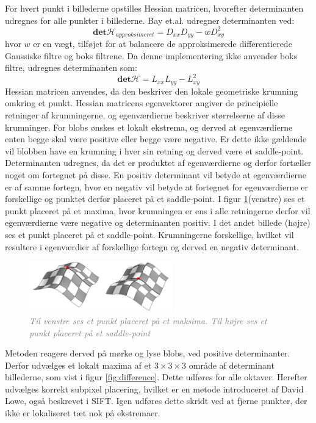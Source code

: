 For hvert punkt i billederne opstilles Hessian matricen, hvorefter determinanten udregnes for alle punkter i billederne. Bay et.al. udregner determinanten ved:
\begin{equation}
\textbf{det}\mathcal{H}_{approksimeret} = D_{xx}D_{yy}-wD_{xy}^2
\label{deerminantofhessian}
\end{equation}
hvor $w$ er en vægt, tilføjet for at balancere de approksimerede differentierede Gaussiske filtre og boks filtrene. Da denne implementering ikke anvender boks filtre, udregnes determinanten som:
\begin{equation}
\textbf{det}\mathcal{H} = L_{xx}L_{yy}-L_{xy}^2
\label{deerminantofhessian}
\end{equation}
Hessian matricen anvendes, da den beskriver den lokale geometriske krumning omkring et punkt. Hessian matricens egenvektorer angiver de principielle retninger af krumningerne, og egenværdierne beskriver størrelserne af disse krumninger. For blobs ønskes et lokalt ekstrema, og derved at egenværdierne enten begge skal være positive eller begge være negative. Er dette ikke gældende vil blobben have en krumning i hver sin retning og derved være et saddle-point. Determinanten udregnes, da det er produktet af egenværdierne og derfor fortæller noget om fortegnet på disse. En positiv determinant vil betyde at egenværdierne er af samme fortegn, hvor en negativ vil betyde at fortegnet for egenværdierne er forskellige og punktet derfor placeret på et saddle-point. I figur \ref{fig:konkav}(venstre) ses et punkt placeret på et maxima, hvor krumningen er ens i alle retningerne derfor vil egenværdierne være negative og determinanten positiv. I det andet billede (højre) ses et punkt placeret på et saddle-point. Krumningerne forskellige, hvilket vil resultere i egenværdier af forskellige fortegn og derved en negativ determinant. 
\begin{figure}[H]
    \centering
    \includegraphics[width=0.55\textwidth]{fig/36.png}
     \vspace{-0.5em}
    \begin{center}    
       \caption{\textcolor{gray}{\footnotesize \textit{Til venstre ses et punkt placeret på et maksima. Til højre ses et punkt placeret på et saddle-point}}}
    \label{fig:konkav}
     \end{center}
     \vspace{-1.5em}
  \end{figure} \noindent
Metoden reagere derved på mørke og lyse blobs, ved positive determinanter. Derfor udvælges et lokalt maxima af et $3\times3\times3$ område af determinant billederne, som vist i figur \ref{fig:difference}. Dette udføres for alle oktaver. Herefter udvælges korrekt subpixel placering, hvilket er en metode introduceret af David Lowe, også beskrevet i SIFT. Igen udføres dette skridt ved at fjerne punkter, der ikke er lokaliseret tæt nok på ekstremaer.
